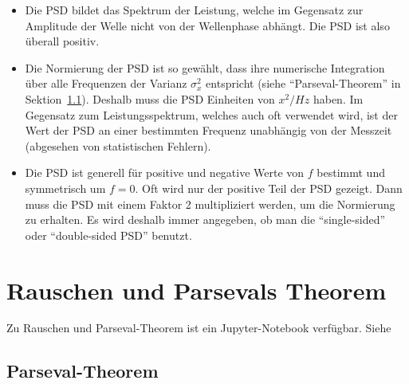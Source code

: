 \begin{itemize}
    \setlength\itemsep{0em}
        \item Die PSD bildet das Spektrum der Leistung, welche im Gegensatz zur Amplitude der Welle nicht von der Wellenphase abhängt. Die PSD ist also überall positiv.
        \item Die Normierung der PSD ist so gewählt, dass ihre numerische Integration über alle Frequenzen der Varianz $\sigma_x^2$ entspricht (siehe ``Parseval-Theorem'' in Sektion~\ref{subsec:vl7-4}). Deshalb muss die PSD Einheiten von $x^2/Hz$ haben. Im Gegensatz zum Leistungsspektrum, welches auch oft verwendet wird, ist der Wert der PSD an einer bestimmten Frequenz unabhängig von der Messzeit (abgesehen von statistischen Fehlern).
        \item Die PSD ist generell für positive und negative Werte von $f$ bestimmt und symmetrisch um $f=0$. Oft wird nur der positive Teil der PSD gezeigt. Dann muss die PSD mit einem Faktor 2 multipliziert werden, um die Normierung zu erhalten. Es wird deshalb immer angegeben, ob man die ``single-sided'' oder ``double-sided PSD'' benutzt.
\end{itemize}

\section{Rauschen und Parsevals Theorem}\label{sec:Parseval}
\begin{center}
\begin{tcolorbox}[enhanced,width=6in,center upper,
    fontupper=\large,drop fuzzy shadow southwest,
    colframe=blue!50!black,colback=blue!10]
    {Zu Rauschen und Parseval-Theorem ist ein Jupyter-Notebook verfügbar. Siehe  }
\end{tcolorbox}
\end{center}
\subsection{Parseval-Theorem}
\label{subsec:vl7-4}

